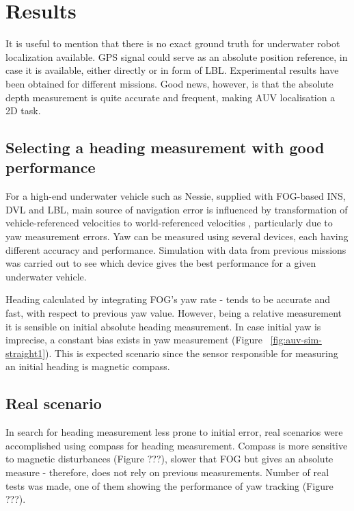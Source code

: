 \chapter{Results} \label{chap:results}
It is useful to mention that there is no exact ground truth for underwater robot localization available. GPS signal could serve as an absolute position reference, in case it is available, either directly or in form of LBL. Experimental results have been obtained for different missions. Good news, however, is that the absolute depth measurement is quite accurate and frequent, making AUV localisation a 2D task.  
\section{Selecting a heading measurement with good performance}
For a high-end underwater vehicle such as Nessie, supplied with FOG-based INS, DVL and LBL, main source of navigation error is influenced by transformation of vehicle-referenced velocities to world-referenced velocities \cite{bahr08}, particularly due to yaw measurement errors. Yaw can be measured using several devices, each having different accuracy and performance. Simulation with data from previous missions was carried out to see which device gives the best performance for a given underwater vehicle. 

Heading calculated by integrating FOG's yaw rate - tends to be accurate and fast, with respect to previous yaw value. However, being a relative measurement it is sensible on initial absolute heading measurement. In case initial yaw is imprecise, a constant bias exists in yaw measurement (Figure ~\ref{fig:auv-sim-straight1}). This is expected scenario since the sensor responsible for measuring an initial heading is magnetic compass. 

\section{Real scenario}
In search for heading measurement less prone to initial error, real scenarios were accomplished using compass for heading measurement. Compass is more sensitive to magnetic disturbances (Figure ???), slower that FOG but gives an absolute measure - therefore, does not rely on previous measurements.
Number of real tests was made, one of them showing the performance of yaw tracking (Figure ???).  
